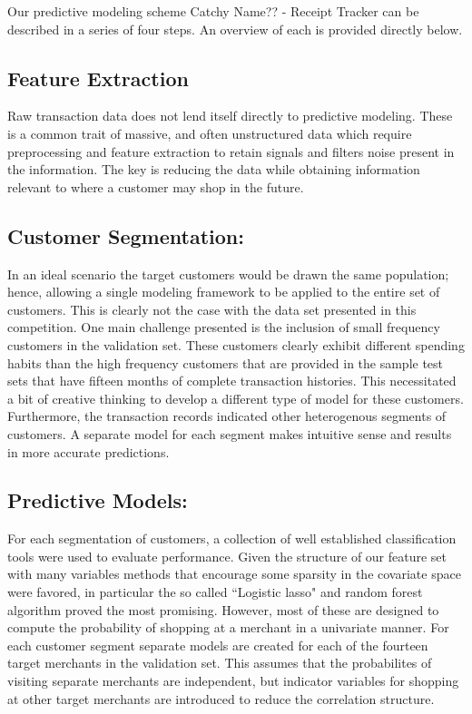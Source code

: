 \documentclass[12pt]{article} %
\begin{document}
Our predictive modeling scheme \ac{Catchy Name?? - Receipt Tracker} can be described in a series of four steps.  An overview of each is provided directly below.
\subsection*{Feature Extraction} 
Raw transaction data does not lend itself directly to predictive modeling.  These is a common trait of massive, and often unstructured data which require preprocessing and feature extraction to retain signals and filters noise present in the information.  The key is reducing the data while obtaining information relevant to where a customer may shop in the future.   
\subsection*{Customer Segmentation:} 
In an ideal scenario the target customers would be drawn the same population; hence, allowing a single modeling framework to be applied to the entire set of customers.  This is clearly not the case with the data set presented in this competition. One main challenge presented is the inclusion of small frequency customers in the validation set.  These customers clearly exhibit different spending habits than the high frequency customers that are provided in the sample test sets that have fifteen months of complete transaction histories.  This necessitated a bit of creative thinking to develop a different type of model for these customers.  Furthermore, the transaction records indicated other heterogenous segments of customers.  A separate model for each segment makes intuitive sense and results in more accurate predictions.
\subsection*{Predictive Models:} 
For each segmentation of customers, a collection of well established classification tools were used to evaluate performance.  Given the structure of our feature set with many variables methods that encourage some sparsity in the covariate space were favored, in particular the so called ``Logistic lasso" and random forest algorithm proved the most promising.    However, most of these are designed to compute the probability of shopping at a merchant in a univariate manner.  For each customer segment separate models are created for each of the fourteen target merchants in the validation set.  This assumes that the probabilites of visiting separate merchants are independent, but indicator variables for shopping at other target merchants are introduced to reduce the correlation structure. 
\end{document}
